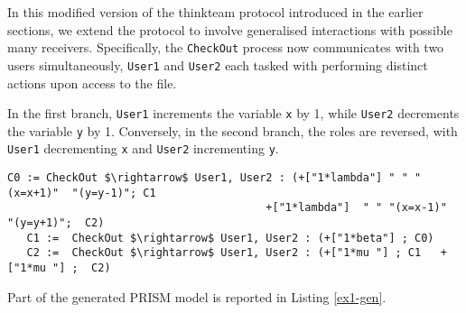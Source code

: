 In this modified version of the thinkteam protocol introduced in the earlier sections, we extend the protocol to involve generalised interactions with possible many receivers. Specifically, the \texttt{CheckOut} process now communicates with two users simultaneously, \texttt{User1} and \texttt{User2} each tasked with performing distinct actions upon access to the file. 

 In the first branch, \texttt{User1} increments the variable \texttt{x} by 1, while \texttt{User2} decrements the variable \texttt{y} by 1. Conversely, in the second branch, the roles are reversed, with \texttt{User1} decrementing \texttt{x} and \texttt{User2} incrementing \texttt{y}.

 \begin{lstlisting}[style=chor-color,breaklines=true, postbreak=\mbox{\textcolor{red}{$\hookrightarrow$}\space},caption={Choreography for the Modified thinkteam Protocol},captionpos=b,label={ex1-chor}]
   C0 := CheckOut $\rightarrow$ User1, User2 : (+["1*lambda"] " " "(x=x+1)"  "(y=y-1)"; C1
                                       	+["1*lambda"]  " " "(x=x-1)"  "(y=y+1)";  C2)
   C1 :=  CheckOut $\rightarrow$ User1, User2 : (+["1*beta"] ; C0)  
   C2 :=  CheckOut $\rightarrow$ User1, User2 : (+["1*mu "] ; C1   +["1*mu "] ;  C2)
 \end{lstlisting}

 Part of the generated PRISM model is reported in Listing \ref{ex1-gen}. 

